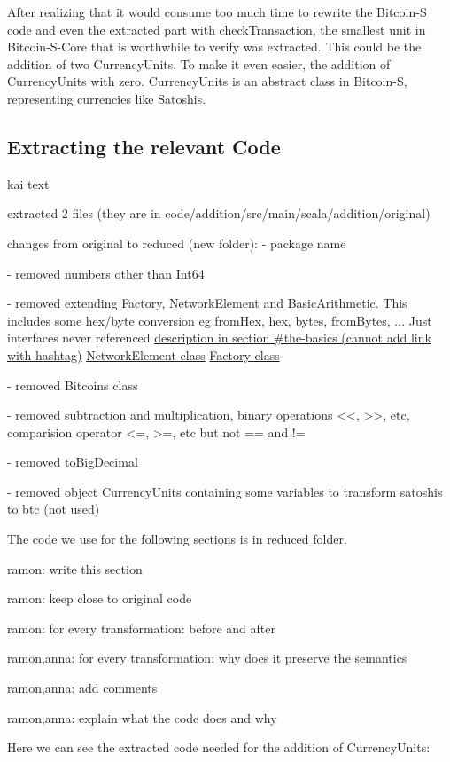 \documentclass[runningheads]{llncs}
\newcommand{\todo}[1]{{\par \color{red}#1}}
\begin{document}
After realizing that it would consume too much time to rewrite the
Bitcoin-S code and even the extracted part with checkTransaction, the
smallest unit in Bitcoin-S-Core that is worthwhile to verify was
extracted.  This could be the addition of two CurrencyUnits.  To make
it even easier, the addition of CurrencyUnits with zero.
CurrencyUnits is an abstract class in Bitcoin-S, representing
currencies like Satoshis.

\subsection{Extracting the relevant Code}

\todo{
kai text

extracted 2 files (they are in code/addition/src/main/scala/addition/original)

changes from original to reduced (new folder):
  - package name

  - removed numbers other than Int64

  - removed extending Factory, NetworkElement and BasicArithmetic. This includes some hex/byte conversion eg fromHex, hex, bytes, fromBytes, ... Just interfaces never referenced
    \href{https://bitcoin-s.org/docs/core/core-intro\#the-basics}{description in section \#the-basics (cannot add link with hashtag)}
    \href{https://github.com/bitcoin-s/bitcoin-s/blob/master/core/src/main/scala/org/bitcoins/core/protocol/NetworkElement.scala}{NetworkElement class}
    \href{https://github.com/bitcoin-s/bitcoin-s/blob/master/core/src/main/scala/org/bitcoins/core/util/Factory.scala}{Factory class}

  - removed Bitcoins class

  - removed subtraction and multiplication, binary operations <<, >>, etc, comparision operator <=, >=, etc but not == and !=

  - removed toBigDecimal

  - removed object CurrencyUnits containing some variables to transform satoshis to btc (not used)

  The code we use for the following sections is in reduced folder.
}

\todo{ramon: write this section}
\todo{ramon: keep close to original code}
\todo{ramon: for every transformation: before and after}
\todo{ramon,anna: for every transformation: why does it preserve the semantics}
\todo{ramon,anna: add comments}
\todo{ramon,anna: explain what the code does and why}

Here we can see the extracted code needed for the addition of CurrencyUnits:


\end{document}
